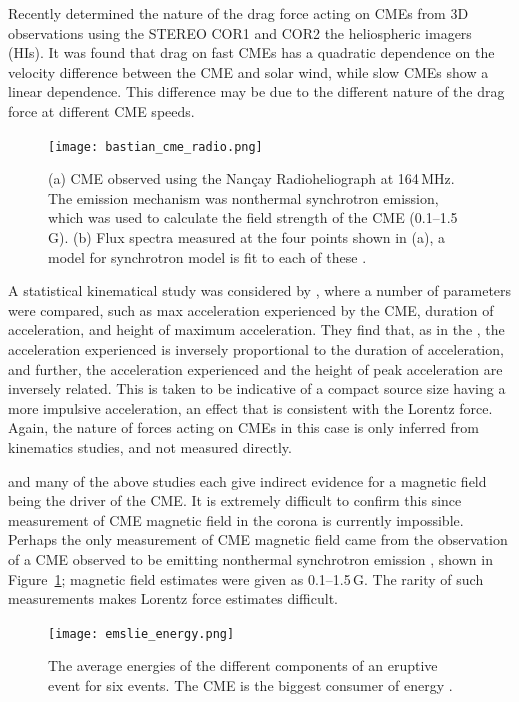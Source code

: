 Recently \citet{malo10} determined the nature of the drag force acting on CMEs from 3D observations using the STEREO COR1 and COR2 the heliospheric imagers (HIs). It was found that drag on fast CMEs has a quadratic dependence on the velocity difference between the CME and solar wind, while slow CMEs show a linear dependence. This difference may be due to the different nature of the drag force at different CME speeds.
\begin{figure}[t!]
\begin{center}
\texttt{[image: bastian\_cme\_radio.png]}
\caption[Nonthermal synchrotron emission in a CME]{(a) CME observed using the Nan\c{c}ay Radioheliograph at 164\,MHz. The emission mechanism was nonthermal synchrotron emission, which was used to calculate the field strength of the CME (0.1--1.5\,G). (b) Flux spectra measured at the four
points shown in (a), a model for synchrotron model is fit to each of these \citep{bastian2001}.}
\label{fig:bastian_cme}
\end{center}
\end{figure}
A statistical kinematical study was considered by \citet{bein2011}, where a number of parameters were compared, such as max acceleration experienced by the CME, duration of acceleration, and height of maximum acceleration. They find that, as in the \citet[][Figure~\ref{fig:acell_duration}]{zhang2006}, the acceleration experienced is inversely proportional to the duration of acceleration, and further, the acceleration experienced and the height of peak acceleration are inversely related. This is taken to be indicative of a compact source size having a more impulsive acceleration, an effect that is consistent with the Lorentz force. Again, the nature of forces acting on CMEs in this case is only inferred from kinematics studies, and not measured directly. 

\citet{bein2011} and many of the above studies each give indirect evidence for a magnetic field being the driver of the CME. It is extremely difficult to confirm this since measurement of CME magnetic field in the corona is currently impossible. Perhaps the only measurement of CME magnetic field came from the observation of a CME observed to be emitting nonthermal synchrotron emission \citep{bastian2001}, shown in Figure~\ref{fig:bastian_cme}; magnetic field estimates were given as 0.1--1.5\,G. The rarity of such measurements makes Lorentz force estimates difficult.
\begin{figure}[t!]
\begin{center}
\texttt{[image: emslie\_energy.png]}
\caption[Energy components of an eruptive event.]{The average energies of the different components of an eruptive event for six events. The CME is the biggest consumer of energy \citep{emslie2012}.}
\label{fig:emslie_energy}
\end{center}
\end{figure}


